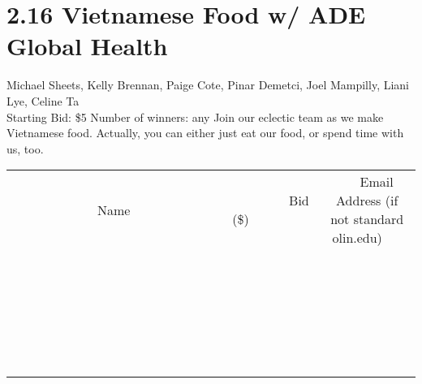 \documentclass[11pt]{article}
\begin{document}
\section*{2.16 Vietnamese Food w/ ADE Global Health}
Michael Sheets, Kelly Brennan, Paige Cote, Pinar Demetci, Joel Mampilly, Liani Lye, Celine Ta
\\
Starting Bid: \$5
\newline
Number of winners: any
\newline
Join our eclectic team as we make Vietnamese food.  Actually, you can either just eat our food, or spend time with us, too.
\\[6ex]
\begin{tabular}{c c c}
~~~~~~~~~~~~~Name~~~~~~~~~~~~~ & ~~~~~~~~~Bid (\$)~~~~~~~~~  & ~~~Email Address (if not standard olin.edu)~~~\\
 & & \\
\hline
 & & \\
\hline
 & & \\
\hline
 & & \\
\hline
 & & \\
\hline
 & & \\
\hline
 & & \\
\hline
 & & \\
\hline
 & & \\
\hline
 & & \\
\hline
 & & \\
\hline
 & & \\
\hline
 & & \\
\hline
 & & \\
\hline
 & & \\
\hline
 & & \\
\hline
 & & \\
\hline
 & & \\
\hline
 & & \\
\hline
 & & \\
\hline
 & & \\
\hline
 & & \\
\hline
 & & \\
\hline
 & & \\
\hline
 & & \\
\hline
 & & \\
\hline
\end{tabular}
\newpage
\end{document}
